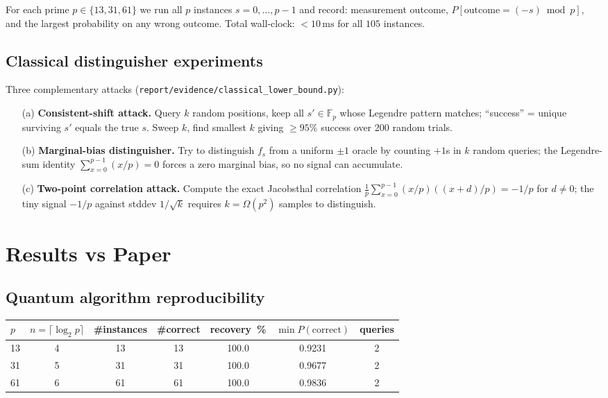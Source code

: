 \documentclass[11pt]{article}
\begin{document}
For each prime $p\in\{13,31,61\}$ we run all $p$ instances $s=0,\ldots,p-1$
and record: measurement outcome, $P[\mathrm{outcome}=(-s)\bmod p]$, and the
largest probability on any wrong outcome. Total wall-clock: $<10\,\mathrm{ms}$
for all $105$ instances.

\subsection{Classical distinguisher experiments}\label{sec:classical}

Three complementary attacks (\verb|report/evidence/classical_lower_bound.py|):
\begin{itemize}
  \item[(a)] \textbf{Consistent-shift attack.} Query $k$ random positions,
    keep all $s' \in \mathbb{F}_p$ whose Legendre pattern matches;
    ``success'' = unique surviving $s'$ equals the true $s$. Sweep $k$,
    find smallest $k$ giving $\geq 95\%$ success over 200 random trials.
  \item[(b)] \textbf{Marginal-bias distinguisher.} Try to distinguish
    $f_s$ from a uniform $\pm1$ oracle by counting $+1$s in $k$ random
    queries; the Legendre-sum identity $\sum_{x=0}^{p-1}(x/p) = 0$ forces
    a zero marginal bias, so no signal can accumulate.
  \item[(c)] \textbf{Two-point correlation attack.} Compute the exact
    Jacobsthal correlation
    $\tfrac{1}{p}\sum_{x=0}^{p-1}(x/p)((x+d)/p) = -1/p$
    for $d\neq 0$; the tiny signal $-1/p$ against stddev $1/\sqrt{k}$
    requires $k = \Omega(p^2)$ samples to distinguish.
\end{itemize}

\section{Results vs Paper}

\subsection{Quantum algorithm reproducibility}

\begin{longtable}{lcccccc}
\toprule
$p$ & $n = \lceil\log_2 p\rceil$ &
\#instances & \#correct & recovery~\% &
$\min P(\text{correct})$ & queries \\
\midrule
13 & 4 & 13 & 13 & 100.0 & 0.9231 & 2 \\
31 & 5 & 31 & 31 & 100.0 & 0.9677 & 2 \\
61 & 6 & 61 & 61 & 100.0 & 0.9836 & 2 \\
\bottomrule
\end{longtable}
\end{document}
